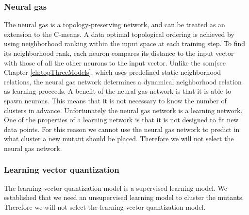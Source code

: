 \documentclass[../../main]{subfiles}
\begin{document}
\subsubsection{Neural gas}
The neural gas is a topology-preserving network, and can be treated as an extension to the C-means\cite{Du2010Clustering:Approach}.
A data optimal topological ordering is achieved by using neighborhood ranking within the input space at each training step\cite{Du2010Clustering:Approach}.
To find its neighborhood rank, each neuron compares its distance to the input vector with those of all the other neurons to the input vector\cite{Du2010Clustering:Approach}. 
Unlike the \acrfull{som}(see Chapter \ref{ch:topThreeModels}, which uses predefined static neighborhood relations, the neural gas network determines a dynamical neighborhood relation as learning proceeds\cite{Du2010Clustering:Approach}.
A benefit of the neural gas network is that it is able to spawn neurons.
This means that it is not necessary to know the number of clusters in advance.
Unfortunately the neural gas network is a learning network.
One of the properties of a learning network is that it is not designed to fit new data points\cite{supervisedUnsupervised}.
For this reason we cannot use the neural gas network to predict in what cluster a new mutant should be placed.
Therefore we will not select the neural gas network.

\subsubsection{Learning vector quantization}
The learning vector quantization model is a supervised learning model.
We established that we need an unsupervised learning model to cluster the mutants.
Therefore we will not select the learning vector quantization model.
\end{document}
